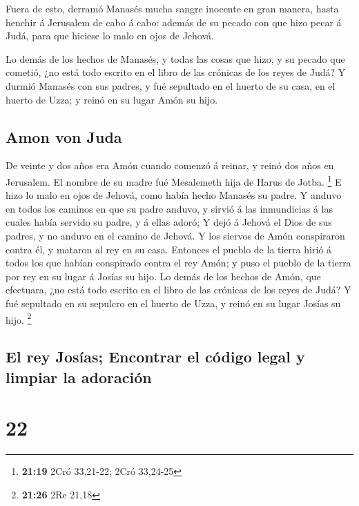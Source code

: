  Fuera de esto, derramó Manasés mucha sangre inocente en
gran manera, hasta henchir á Jerusalem de cabo á cabo: además de su
pecado con que hizo pecar á Judá, para que hiciese lo malo en ojos de
Jehová.

 Lo demás de los hechos de Manasés, y todas las cosas que
hizo, y su pecado que cometió, ¿no está todo escrito en el libro de las
crónicas de los reyes de Judá?  Y durmió Manasés con sus
padres, y fué sepultado en el huerto de su casa, en el huerto de Uzza; y
reinó en su lugar Amón su hijo.

\hypertarget{amon-von-juda}{%
\subsection{Amon von Juda}\label{amon-von-juda}}

 De veinte y dos años era Amón cuando comenzó á reinar, y
reinó dos años en Jerusalem. El nombre de su madre fué Mesalemeth hija
de Harus de Jotba. \footnote{\textbf{21:19} 2Cró 33,21-22; 2Cró 33,24-25}
 E hizo lo malo en ojos de Jehová, como había hecho Manasés
su padre.  Y anduvo en todos los caminos en que su padre
anduvo, y sirvió á las inmundicias á las cuales había servido su padre,
y á ellas adoró;  Y dejó á Jehová el Dios de sus padres, y
no anduvo en el camino de Jehová.  Y los siervos de Amón
conspiraron contra él, y mataron al rey en su casa. 
Entonces el pueblo de la tierra hirió á todos los que habían conspirado
contra el rey Amón; y puso el pueblo de la tierra por rey en su lugar á
Josías su hijo.  Lo demás de los hechos de Amón, que
efectuara, ¿no está todo escrito en el libro de las crónicas de los
reyes de Judá?  Y fué sepultado en su sepulcro en el huerto
de Uzza, y reinó en su lugar Josías su hijo. \footnote{\textbf{21:26}
  2Re 21,18}

\hypertarget{el-rey-josuxedas-encontrar-el-cuxf3digo-legal-y-limpiar-la-adoraciuxf3n}{%
\subsection{El rey Josías; Encontrar el código legal y limpiar la
adoración}\label{el-rey-josuxedas-encontrar-el-cuxf3digo-legal-y-limpiar-la-adoraciuxf3n}}

\hypertarget{section-21}{%
\section{22}\label{section-21}}


